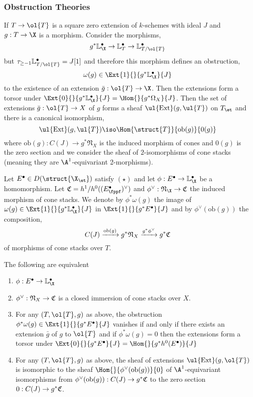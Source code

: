 \documentclass[12pt]{article}
\newcommand{\LL}{\mathbb{L}}
\newcommand{\ob}{\mathrm{ob}}
\begin{document}
\subsubsection{Obstruction Theories}

If $T \to \ol{T}$ is a square zero extension of $k$-schemes with ideal $J$ and $g : T \to \X$ is a morphism. Consider the morphisms,
\[ g^* \LL_{\X}^\bullet \to \LL_{T}^\bullet \to \LL^\bullet_{T/\ol{T}} \]
but $\tau_{\ge -1} \LL^\bullet_{T/\ol{T}} = J[1]$ and therefore this morphism defines an obstruction,
\[ \omega(g) \in \Ext{1}{}{g^* \LL_{\X}^\bullet}{J} \]
to the existence of an extension $\bar{g} : \ol{T} \to \X$. Then the extensions form a torsor under $\Ext{0}{}{g^* \LL_{\X}^\bullet}{J} = \Hom{}{g^* \Omega_X}{J}$. Then the set of extensions $\bar{g} : \ol{T} \to X$ of $g$ forms a sheaf $\ul{\mathrm{Ext}}(g, \ul{T})$ on $T_{\et}$ and there is a canonical isomorphism,
\[ \ul{\mathrm{Ext}}(g, \ul{T}) \iso \Hom{\struct{T}}{\ob(g)}{0(g)} \]
where $\ob(g) : C(J) \to g^* \mathfrak{N}_X$ is the induced morphism of cones and $0(g)$ is the zero section and we consider the sheaf of $2$-isomorphisms of cone stacks (meaning they are $\A^1$-equivariant 2-morphisms). 
\par
Let $E^\bullet \in D(\struct{\X_{\et}})$ satisfy $(\star)$ and let $\phi : E^\bullet \to \LL_{\X}^\bullet$ be a homomorphism. Let $\fC = h^1/h^0((E^\bullet_{\fppf})^\vee)$ and $\phi^\vee : \mathfrak{N}_{\X} \to \fC$ the induced morphism of cone stacks. We denote by $\phi^* \omega(g)$ the image of $\omega(g) \in \Ext{1}{}{g^* \LL_{\X}^\bullet}{J}$ in $\Ext{1}{}{g^* E^\bullet}{J}$ and by $\phi^\vee(\ob(g))$ the composition,
\[ C(J) \xrightarrow{\ob(g)} g^* \mathfrak{N}_X \xrightarrow{g^* \phi^\vee} g^* \fC \]
of morphisms of cone stacks over $T$.

\begin{theorem}
The following are equivalent
\begin{enumerate}
\item $\phi : E^\bullet \to \LL_{\X}^\bullet$
\item $\phi^\vee : \mathfrak{N}_X \to \mathfrak{C}$ is a closed immersion of cone stacks over $X$.
\item For any $(T, \ol{T}, g)$ as above, the obstruction $\phi^* \omega(g) \in \Ext{1}{}{g^* E^\bullet}{J}$ vanishes if and only if there exists an extension $\bar{g}$ of $g$ to $\ol{T}$ and if $\phi^* \omega(g) = 0$ then the extensions form a torsor under $\Ext{0}{}{g^* E^\bullet}{J} = \Hom{}{g^* h^0(E^\bullet)}{J}$
\item For any $(T, \ol{T}, g)$ as above, the sheaf of extensions $\ul{\mathrm{Ext}}(g, \ol{T})$ is isomorphic to the sheaf $\Hom{}{\phi^\vee(\ob(g))}{0}$ of $\A^1$-equivariant isomorphisms from $\phi^\vee(\ob(g)) : C(J) \to g^* \fC$ to the zero section $0 : C(J) \to g^* \mathfrak{C}$.
\end{enumerate}
\end{theorem}
\end{document}
